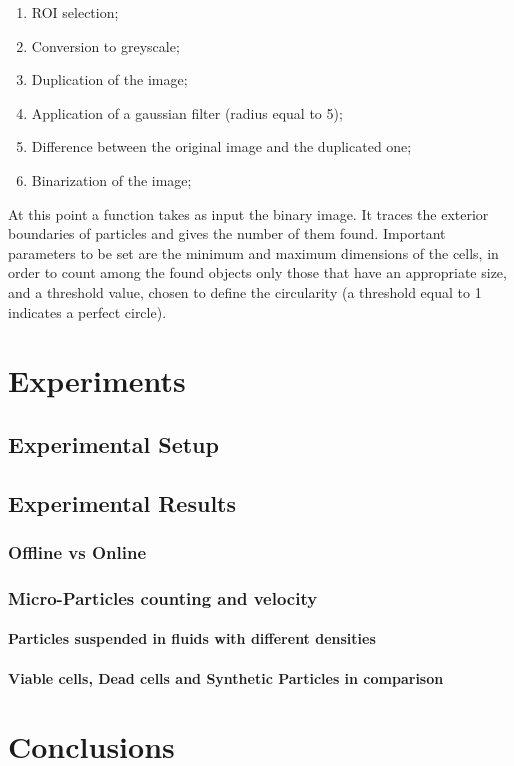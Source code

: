 \documentclass[journal]{IEEEtran}
\theoremstyle{definition}
\theoremstyle{remark}
\begin{document}
 \begin{enumerate}
 	\item ROI selection;
 	\item Conversion to greyscale;
 	\item Duplication of the image;
 	\item Application of a gaussian filter (radius equal to 5);
 	\item Difference between the original image and the duplicated one;
 	\item Binarization of the image;
 \end{enumerate}
At this point a function takes as input the binary image. It traces the exterior boundaries of particles and gives the number of them found.
Important parameters to be set are the minimum and maximum dimensions of the cells, in order to count among the found objects only those that have an appropriate size, and a threshold value, chosen to define the circularity (a threshold equal to 1 indicates a perfect circle).



\section{Experiments}

\subsection{Experimental Setup}

\subsection{Experimental Results}

\subsubsection{Offline vs Online}

\subsubsection{Micro-Particles counting and velocity}

\paragraph{Particles suspended in fluids with different densities}

\paragraph{Viable cells, Dead cells and Synthetic Particles in comparison}

\section{Conclusions}




\end{document}

